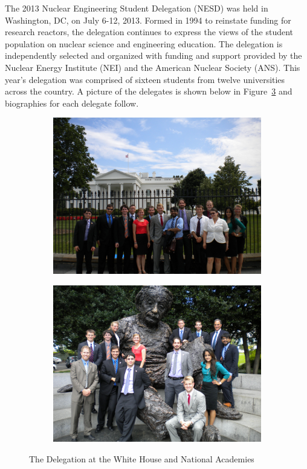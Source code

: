 The 2013 Nuclear Engineering Student Delegation (NESD) was held in Washington,
DC, on July 6-12, 2013. Formed in 1994 to reinstate funding for research
reactors, the delegation continues to express the views of the student
population on nuclear science and engineering education. The delegation is
independently selected and organized with funding and support provided by the
Nuclear Energy Institute (NEI) and the American Nuclear Society (ANS). This
year’s delegation was comprised of sixteen students from twelve universities
across the country. A picture of the delegates is shown below in
Figure~\ref{fig:delegates} and biographies for each delegate follow.

\begin{figure}[h]
\centering
\begin{subfigure}{.5 \textwidth}
  \centering
  \includegraphics[width=.95 \linewidth]{NESD_WH.jpg}
  \label{fig:whitehouse}
\end{subfigure}%
\begin{subfigure}{.5\textwidth}
  \centering
  \includegraphics[width=.95 \linewidth]{NESD_Ein.jpg}
  \label{fig:einstein}
\end{subfigure}
\caption{The Delegation at the White House and National Academies}
\label{fig:delegates}
\end{figure}

